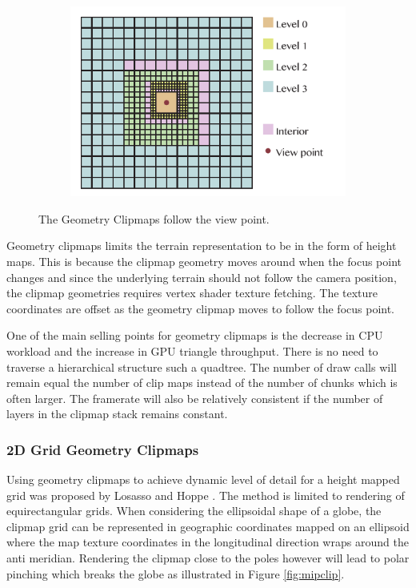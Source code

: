 \begin{figure}[htbp]
    \centering
    \begin{subfigure}[bt]{0.6\textwidth}
        \includegraphics[width=\textwidth]{figures/geometryclipmap/clipmap_geo.pdf}
    \end{subfigure}
    \caption{The Geometry Clipmaps follow the view point.}
    \label{fig:clipmapgeometry}
\end{figure}

Geometry clipmaps limits the terrain representation to be in the form of height maps. This is because the clipmap geometry moves around when the focus point changes and since the underlying terrain should not follow the camera position, the clipmap geometries requires vertex shader texture fetching. The texture coordinates are offset as the geometry clipmap moves to follow the focus point.

One of the main selling points for geometry clipmaps is the decrease in CPU workload and the increase in GPU triangle throughput. There is no need to traverse a hierarchical structure such a quadtree. The number of draw calls will remain equal the number of clip maps instead of the number of chunks which is often larger. The framerate will also be relatively consistent if the number of layers in the clipmap stack remains constant.

\subsubsection{2D Grid Geometry Clipmaps}
Using geometry clipmaps to achieve dynamic level of detail for a height mapped grid was proposed by Losasso and Hoppe \cite{losasso04}. The method is limited to rendering of equirectangular grids. When considering the ellipsoidal shape of a globe, the clipmap grid can be represented in geographic coordinates mapped on an ellipsoid where the map texture coordinates in the longitudinal direction wraps around the anti meridian. Rendering the clipmap close to the poles however will lead to polar pinching which breaks the globe as illustrated in Figure \ref{fig:mipclip}.

